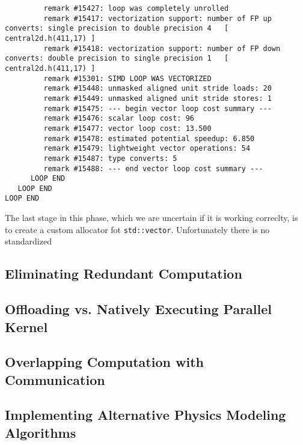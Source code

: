{\begin{lstlisting}
         remark #15427: loop was completely unrolled
         remark #15417: vectorization support: number of FP up converts: single precision to double precision 4   [ central2d.h(411,17) ]
         remark #15418: vectorization support: number of FP down converts: double precision to single precision 1   [ central2d.h(411,17) ]
         remark #15301: SIMD LOOP WAS VECTORIZED
         remark #15448: unmasked aligned unit stride loads: 20 
         remark #15449: unmasked aligned unit stride stores: 1 
         remark #15475: --- begin vector loop cost summary ---
         remark #15476: scalar loop cost: 96 
         remark #15477: vector loop cost: 13.500 
         remark #15478: estimated potential speedup: 6.850 
         remark #15479: lightweight vector operations: 54 
         remark #15487: type converts: 5 
         remark #15488: --- end vector loop cost summary ---
      LOOP END
   LOOP END
LOOP END
\end{lstlisting}
}

The last stage in this phase, which we are uncertain if it is working correclty, is to create a custom allocator fot \texttt{std::vector}.  Unfortunately there is no standardized 

\subsection{Eliminating Redundant Computation}
\label{sec-tune-eliminating}

\subsection{Offloading vs. Natively Executing Parallel Kernel}
\label{sec-tune-offloading}

\subsection{Overlapping Computation with Communication}
\label{sec-tune-overlapping}

\subsection{Implementing Alternative Physics Modeling Algorithms}
\label{sec-tune-implementing}
